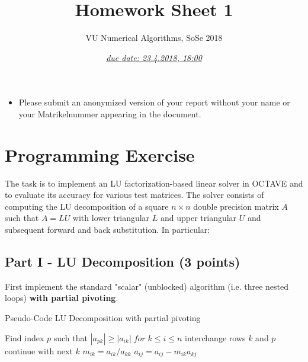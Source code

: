 \documentclass{scrartcl}
\title{Homework Sheet 1}
\subtitle{VU Numerical Algorithms, SoSe 2018}
\date{\underline{\emph{due date: 23.4.2018, 18:00}}}
\newenvironment{mymdframed}[1]{%
\mdfsetup{%
frametitle={\colorbox{white}{\,#1\,}},
frametitleaboveskip=-\ht\strutbox,
frametitlealignment=\raggedright
}%
\begin{mdframed}[style=exampledefault]
}{\end{mdframed}}
\begin{document}
\maketitle

            \begin{itemize}
                \item Please submit an anonymized version of your report without your name or your Matrikelnummer appearing in the document. 
            \end{itemize}


\section*{Programming Exercise}
    The task is to implement an LU factorization-based linear solver in OCTAVE and to evaluate its accuracy for various test matrices. The solver consists of computing the LU decomposition of a square $n \times n$ double precision matrix $A$ such that $A = LU$ with lower triangular $L$ and upper triangular $U$ and subsequent forward and back substitution. In particular:
        
    \subsection*{Part I - LU Decomposition (3 points)}
        First implement the standard "scalar" (unblocked) algorithm (i.e. three nested loops) \textbf{with partial pivoting}.
        
        \begin{algorithm}
            \caption{Pseudo-Code LU Decomposition with partial pivoting}
            \begin{algorithmic}
                    \STATE Find index $p$ such that
                    \STATE $|a_{pk}| \geq |a_{ik}| \; for \; k \leq i \leq n$
                        \STATE interchange rows $k$ and $p$
                    \ENDIF
                        \STATE continue with next $k$
                    \ENDIF
                        \STATE $m_{ik} = a_{ik} / a_{kk}$
                    \ENDFOR
                            \STATE $a_{ij} = a_{ij} - m_{ik}a_{kj}$
                        \ENDFOR
                    \ENDFOR
                \ENDFOR
            \end{algorithmic}
        \end{algorithm}
    
\end{document}
